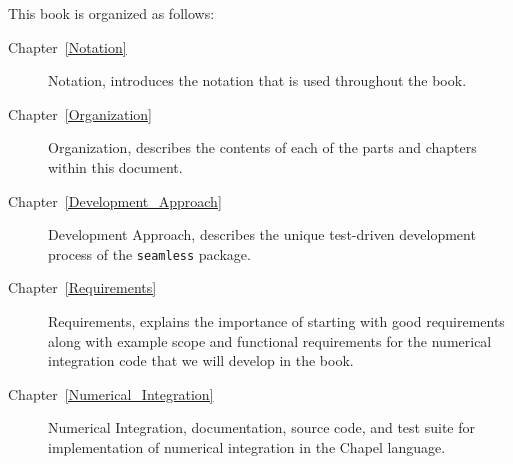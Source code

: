 \label{Organization}

This book is organized as follows:

\begin{description}

\item[Chapter~\ref{Notation}] Notation, introduces the notation that is used
throughout the book.


\item[Chapter~\ref{Organization}] Organization, describes the contents of
each of the parts and chapters within this document.

\item[Chapter~\ref{Development_Approach}] Development Approach, describes 
the unique test-driven development process of the \lstinline{seamless} package.

\item[Chapter~\ref{Requirements}] Requirements, explains the importance of starting
with good requirements along with example scope and functional requirements for 
the numerical integration code that we will develop in the book.

\item[Chapter~\ref{Numerical_Integration}] Numerical Integration, documentation, source
code, and test suite for implementation of numerical integration in the Chapel language.


\end{description}
